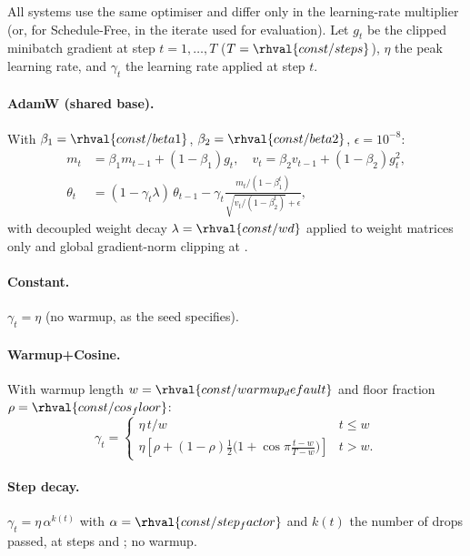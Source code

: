 All systems use the same optimiser and differ only in the learning-rate multiplier (or, for Schedule-Free, in the iterate used for evaluation). Let $g_t$ be the clipped minibatch gradient at step $t=1,\dots,T$ ($T=\rhval{const/steps}$), $\eta$ the peak learning rate, and $\gamma_t$ the learning rate applied at step $t$.

\paragraph{AdamW (shared base).} With $\beta_1=\rhval{const/beta1}$, $\beta_2=\rhval{const/beta2}$, $\epsilon=10^{-8}$:
\begin{align}
m_t &= \beta_1 m_{t-1} + (1-\beta_1) g_t, \quad v_t = \beta_2 v_{t-1} + (1-\beta_2) g_t^2,\\
\theta_{t} &= (1-\gamma_t\lambda)\,\theta_{t-1} - \gamma_t \frac{m_t/(1-\beta_1^t)}{\sqrt{v_t/(1-\beta_2^t)}+\epsilon},
\end{align}
with decoupled weight decay $\lambda=\rhval{const/wd}$ applied to weight matrices only and global gradient-norm clipping at .

\paragraph{Constant.} $\gamma_t=\eta$ (no warmup, as the seed specifies).

\paragraph{Warmup+Cosine.} With warmup length $w=\rhval{const/warmup_default}$ and floor fraction $\rho=\rhval{const/cos_floor}$:
\begin{equation}
\gamma_t=\begin{cases}\eta\,t/w & t\le w\\ \eta\left[\rho + (1-\rho)\tfrac12\bigl(1+\cos\pi\tfrac{t-w}{T-w}\bigr)\right] & t>w.\end{cases}
\end{equation}

\paragraph{Step decay.} $\gamma_t=\eta\,\alpha^{k(t)}$ with $\alpha=\rhval{const/step_factor}$ and $k(t)$ the number of drops passed, at steps  and ; no warmup.

